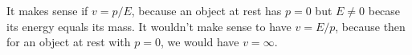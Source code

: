 It makes sense if $v=p/E$, because an object at rest has $p=0$ but $E\ne 0$ becase its energy equals
its mass. It wouldn't make sense to have $v=E/p$, because then for an object at rest with $p=0$, we
would have $v=\infty$.
